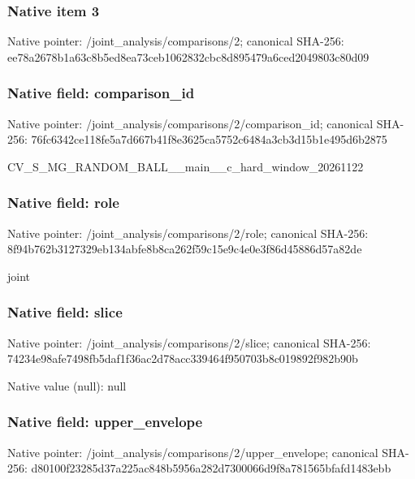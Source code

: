 \documentclass[10pt,a4paper]{article}
\begin{document}
\subsubsection{Native item 3}


Native pointer: /joint\_analysis/comparisons/2; canonical SHA-256: ee78a2678b1a63c8b5ed8ea7\allowbreak{}3ceb1062832cbc8d895479a6\allowbreak{}ced2049803c80d09



\subsubsection{Native field: comparison\_id}


Native pointer: /joint\_analysis/comparis\allowbreak{}ons/2/comparison\_id; canonical SHA-256: 76fc6342ce118fe5a7d667b4\allowbreak{}1f8e3625ca5752c6484a3cb3\allowbreak{}d15b1e495d6b2875


CV\_S\_MG\_RANDOM\_BALL\_\_mai\allowbreak{}n\_\_c\_hard\_window\_2026112\allowbreak{}2


\subsubsection{Native field: role}


Native pointer: /joint\_analysis/comparisons/2/role; canonical SHA-256: 8f94b762b3127329eb134abf\allowbreak{}e8b8ca262f59c15e9c4e0e3f\allowbreak{}86d45886d57a82de


joint


\subsubsection{Native field: slice}


Native pointer: /joint\_analysis/comparisons/2/slice; canonical SHA-256: 74234e98afe7498fb5daf1f3\allowbreak{}6ac2d78acc339464f950703b\allowbreak{}8c019892f982b90b



Native value (null): null



\subsubsection{Native field: upper\_envelope}


Native pointer: /joint\_analysis/comparis\allowbreak{}ons/2/upper\_envelope; canonical SHA-256: d80100f23285d37a225ac848\allowbreak{}b5956a282d7300066d9f8a78\allowbreak{}1565bfafd1483ebb
\end{document}
